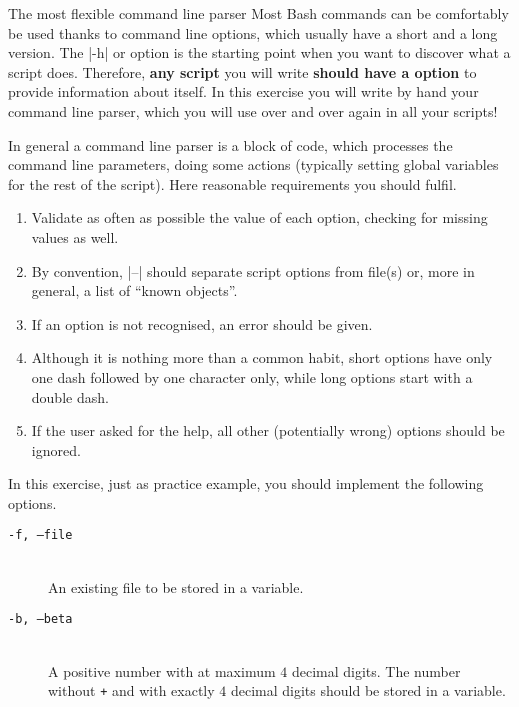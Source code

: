 
\begin{exercise}[Inspirational]{The most flexible command line parser}
    Most Bash commands can be comfortably be used thanks to command line options, which usually have a short and a long version.
    The \bash|-h| or  option is the starting point when you want to discover what a script does.
    Therefore, \textbf{any script} you will write \textbf{should have a  option} to provide information about itself.
    In this exercise you will write by hand your command line parser, which you will use over and over again in all your scripts!

    In general a command line parser is a block of code, which processes the command line parameters, doing some actions (typically setting global variables for the rest of the script).
    Here reasonable requirements you should fulfil.
    \begin{enumerate}
        \item Validate as often as possible the value of each option, checking for missing values as well.
        \item By convention, \bash|--| should separate script options from file(s) or, more in general, a list of ``known objects''.
        \item If an option is not recognised, an error should be given.
        \item Although it is nothing more than a common habit, short options have only one dash followed by one character only, while long options start with a double dash.
        \item If the user asked for the help, all other (potentially wrong) options should be ignored.
    \end{enumerate}
    In this exercise, just as practice example, you should implement the following options.
    \begin{description}
        \item[\texttt{-f, --file}] ~\\
            An existing file to be stored in a variable.
        \item[\texttt{-b, --beta}] ~\\
            A positive number with at maximum $4$ decimal digits.
            The number without \texttt{+} and with exactly $4$ decimal digits should be stored in a variable.

\end{description}
\end{exercise}

